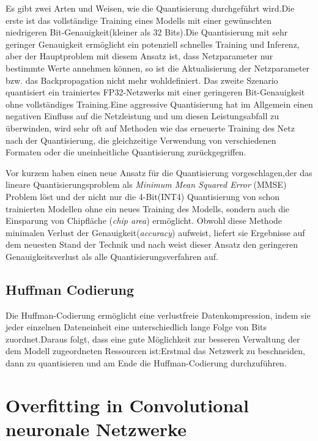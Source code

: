 \documentclass[12pt,a4paper]{scrartcl}
\numberwithin{equation}{section}
\begin{document}
Es gibt zwei Arten und Weisen, wie die Quantisierung durchgeführt wird.Die erste ist das vollständige Training eines Modells mit einer gewünschten niedrigeren Bit-Genauigkeit(kleiner als 32 Bits).Die Quantisierung mit sehr geringer Genauigkeit ermöglicht ein potenziell schnelles Training und Inferenz, aber der Hauptproblem mit diesem Ansatz ist, dass Netzparameter nur bestimmte Werte annehmen können, so ist die Aktualisierung der Netzparameter bzw. das Backpropagation nicht mehr wohldefiniert.
Das zweite Szenario  quantisiert ein trainiertes FP32-Netzwerks mit einer geringeren Bit-Genauigkeit ohne vollständiges Training.Eine aggressive Quantisierung hat im Allgemein einen negativen Einfluss auf die Netzleistung und um diesen Leistungsabfall zu überwinden, wird sehr oft auf Methoden wie das erneuerte Training des Netz nach der Quantisierung, die gleichzeitige Verwendung von verschiedenen Formaten oder die uneinheitliche Quantisierung zurückgegriffen.

Vor kurzem haben \cite[Yoni et al]{quantizationYoni} einen neue Ansatz für die Quantisierung vorgeschlagen,der das lineare Quantisierungsproblem als \textit{Minimum Mean Squared Error} (MMSE) Problem löst und der nicht nur die 4-Bit(INT4) Quantisierung von schon trainierten Modellen ohne ein neues Training des Modells, sondern auch die Einsparung von Chipfläche (\textit{chip area}) ermöglicht. Obwohl diese Methode  minimalen Verlust der Genauigkeit(\textit{accuracy}) aufweist, liefert sie Ergebnisse auf dem neuesten Stand der Technik und nach \cite{quantizationYoni} weist dieser Ansatz den geringeren Genauigkeitsverlust als alle Quantisierungsverfahren auf.

\subsection{Huffman Codierung}
Die Huffman-Codierung ermöglicht eine verlustfreie Datenkompression, indem sie jeder einzelnen Dateneinheit  eine unterschiedlich lange Folge von Bits zuordnet.Daraus folgt, dass eine gute Möglichkeit zur besseren Verwaltung der dem Modell zugeordneten Ressourcen ist:Erstmal das Netzwerk zu beschneiden, dann zu quantisieren und am Ende die Huffman-Codierung durchzuführen. 

 \section{Overfitting in Convolutional   neuronale Netzwerke}
\end{document}
